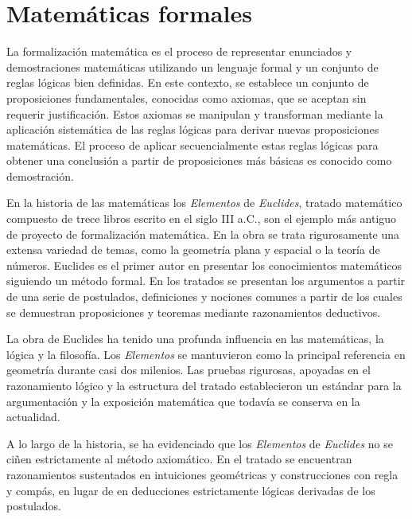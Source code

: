 \section{Matemáticas formales}

La formalización matemática es el proceso de representar enunciados y
demostraciones matemáticas utilizando un lenguaje formal y un conjunto de reglas
lógicas bien definidas. En este contexto, se establece un conjunto de
proposiciones fundamentales, conocidas como axiomas, que se aceptan sin requerir
justificación. Estos axiomas se manipulan y transforman mediante la aplicación
sistemática de las reglas lógicas para derivar nuevas proposiciones matemáticas.
El proceso de aplicar secuencialmente estas reglas lógicas para obtener una
conclusión a partir de proposiciones más básicas es conocido como demostración.


En la historia de las matemáticas los \textit{Elementos} de \textit{Euclides},
tratado matemático compuesto de trece libros escrito en el siglo III a.C., son
el ejemplo más antiguo de proyecto de formalización matemática. En la obra se
trata rigurosamente una extensa variedad de temas, como la geometría plana y
espacial o la teoría de números. Euclides es el primer autor en presentar los
conocimientos matemáticos siguiendo un método formal. En los tratados se
presentan los argumentos a partir de una serie de postulados, definiciones y
nociones comunes a partir de los cuales se demuestran proposiciones y teoremas
mediante razonamientos deductivos.

La obra de Euclides ha tenido una profunda influencia en las matemáticas, la
lógica y la filosofía. Los \textit{Elementos} se mantuvieron como la principal
referencia en geometría durante casi dos milenios. Las pruebas rigurosas,
apoyadas en el razonamiento lógico y la estructura del tratado establecieron un
estándar para la argumentación y la exposición matemática que todavía se
conserva en la actualidad.

A lo largo de la historia, se ha evidenciado que los \textit{Elementos} de
\textit{Euclides} no se ciñen estrictamente al método axiomático. En el tratado
se encuentran razonamientos sustentados en intuiciones geométricas y
construcciones con regla y compás, en lugar de en deducciones estrictamente
lógicas derivadas de los postulados.

